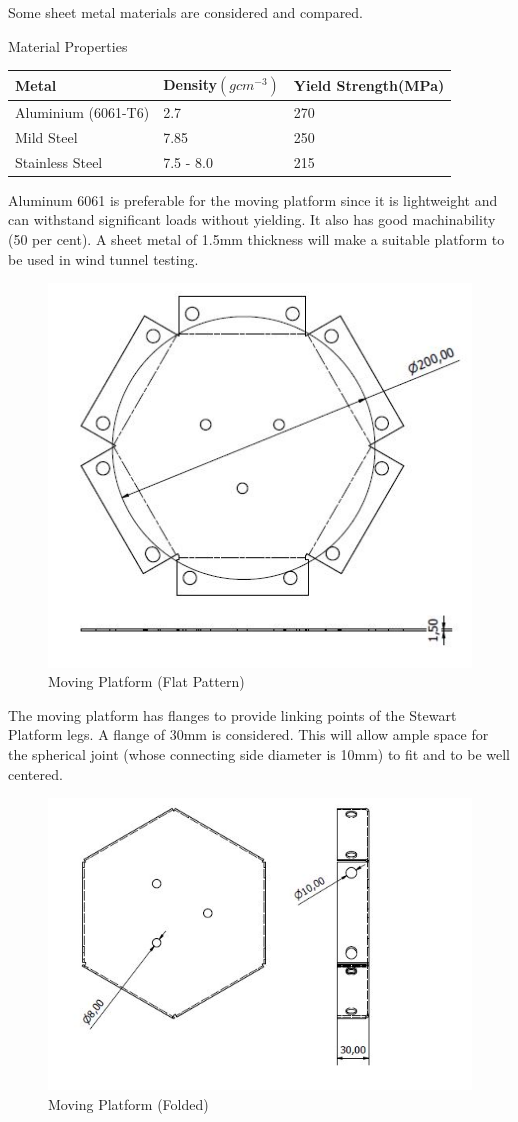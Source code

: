 Some sheet metal materials are considered and compared.
\begin{table}[!h]
	\caption[Sheet Metal Properties]{Material Properties}
\end{table}
\begin{center}
\centering
\begin{tabular}{|l|l|l|}
\hline
\textbf{Metal} & \textbf{Density$(gcm^{-3})$} & \textbf{Yield Strength(MPa)}\\
\hline
Aluminium (6061-T6)& 2.7 & 270\\
\hline
Mild Steel & 7.85 & 250\\
\hline
Stainless Steel & 7.5 - 8.0 & 215\\
\hline
\end{tabular}
\end{center}
Aluminum 6061 is preferable for the moving platform since it is lightweight and can withstand significant loads without yielding. It also has good machinability (50 per cent). A sheet metal of 1.5mm thickness will make a suitable platform to be used in wind tunnel testing.
\begin{center}
	\begin{figure}[!h]
	\centering
	\includegraphics[width=0.6\linewidth]{Figures/Flat}
	\caption[Moving Platform]{Moving Platform (Flat Pattern)}
	\end{figure}
\end{center}

The moving platform has flanges to provide linking points of the Stewart Platform legs. A flange of 30mm is considered. This will allow ample space for the spherical joint (whose connecting side diameter is 10mm) to fit and to be well centered.
\begin{center}
	\begin{figure}[!h]
	\centering
	\includegraphics[width=0.6\linewidth]{Figures/Folded}
	\caption[Moving Platform]{Moving Platform (Folded)}
	\end{figure}
\end{center}

